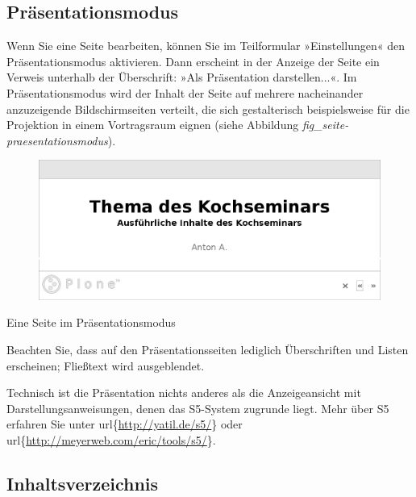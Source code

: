 \documentclass[a4paper,12pt,ngerman]{manual}
\begin{document}
\subsection{Präsentationsmodus}

Wenn Sie eine Seite bearbeiten, können Sie im Teilformular »Einstellungen«
den Präsentationsmodus aktivieren. Dann erscheint in der Anzeige der Seite
ein Verweis unterhalb der Überschrift: »Als Präsentation darstellen...«. Im
Präsentationsmodus wird der Inhalt der Seite auf mehrere nacheinander
anzuzeigende Bildschirmseiten verteilt, die sich gestalterisch
beispielsweise für die Projektion in einem Vortragsraum eignen (siehe
Abbildung \emph{fig\_seite-praesentationsmodus}).
\hypertarget{fig-seite-praesentationsmodus}{}\begin{figure}[htbp]
\centering

\includegraphics{praesentationsmodus.png}
\end{figure}

Eine Seite im Präsentationsmodus

Beachten Sie, dass auf den Präsentationsseiten lediglich Überschriften und
Listen erscheinen; Fließtext wird ausgeblendet.

Technisch ist die Präsentation nichts anderes als die Anzeigeansicht mit
Darstellungsanweisungen, denen das S5-System zugrunde liegt. Mehr über S5
erfahren Sie unter url\{\href{http://yatil.de/s5/}{http://yatil.de/s5/}\} oder
url\{\href{http://meyerweb.com/eric/tools/s5/}{http://meyerweb.com/eric/tools/s5/}\}.


\subsection{Inhaltsverzeichnis}
\end{document}
